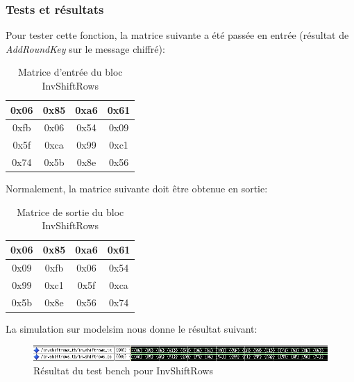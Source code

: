 \documentclass[a4paper, 12pt]{article}
\begin{document}
		\subsubsection{Tests et résultats}
	Pour tester cette fonction, la matrice suivante a été passée en entrée (résultat de \emph{AddRoundKey} sur le message chiffré):
			\begin{table}[H]
				\begin{center}
				\begin{tabular}{|c|c|c|c|}
					\hline
					0x06 & 0x85 & 0xa6 & 0x61 \\
					\hline
					0xfb & 0x06 & 0x54 & 0x09 \\
					\hline
					0x5f & 0xca & 0x99 & 0xc1 \\
					\hline
					0x74 & 0x5b & 0x8e & 0x56 \\
					\hline
				\end{tabular}
				\caption{Matrice d'entrée du bloc InvShiftRows}
				\label{MatriceEntreeInvShiftRows}
				\end{center}
			\end{table}
			
			Normalement, la matrice suivante doit être obtenue en sortie:
			\begin{table}[H]
				\begin{center}
				\begin{tabular}{|c|c|c|c|}
					\hline
					0x06 & 0x85 & 0xa6 & 0x61 \\
					\hline
					0x09 & 0xfb & 0x06 & 0x54 \\
					\hline
					0x99 & 0xc1 & 0x5f & 0xca \\
					\hline
					0x5b & 0x8e & 0x56 & 0x74 \\
					\hline
				\end{tabular}
				\caption{Matrice de sortie du bloc InvShiftRows}
				\label{MatriceSortieInvShiftRows}
				\end{center}
			\end{table}
	La simulation sur modelsim nous donne le résultat suivant:
		\begin{figure}[H]
			\begin{center}
			\includegraphics[scale=0.74]{Images/InvShiftRowsTb.png}
			\end{center}
			\caption{Résultat du test bench pour InvShiftRows}
			\label{InvShiftRowsTb}
		\end{figure}
\end{document}
